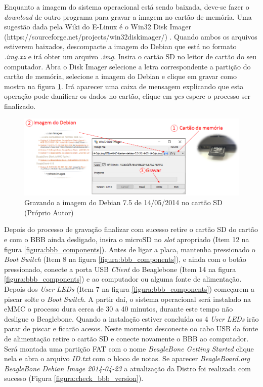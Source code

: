 Enquanto a imagem do sistema operacional está sendo baixada, deve-se fazer o \emph{download} de outro programa para gravar a imagem no cartão de memória. Uma sugestão dada pela Wiki do E-Linux é o Win32 Disk Imager (https://sourceforge.net/projects/win32diskimager/) \cite{elinuxupdatebbb}. Quando ambos os arquivos estiverem baixados, descompacte a imagem do Debian que está no formato \emph{.img.xz} e irá obter um arquivo \emph{.img}. Insira o cartão SD no leitor de cartão do seu computador. Abra o Disk Imager selecione a letra correspondente a partição do cartão de memória, selecione a imagem do Debian e clique em gravar como mostra na figura \ref{figura:update_bbb}. Irá aparecer uma caixa de mensagem explicando que esta operação pode danificar os dados no cartão, clique em \emph{yes} espere o processo ser finalizado.

\begin{figure}[h]
	\centering
	\includegraphics[width=\textwidth]{figuras/update_bbb.png}
	\caption{Gravando a imagem do Debian 7.5 de 14/05/2014 no cartão SD (Próprio Autor)}
	\label{figura:update_bbb}
\end{figure}

Depois do processo de gravação finalizar com sucesso retire o cartão SD do cartão e com o BBB ainda desligado, insira o microSD no \emph{slot} apropriado (Item 12 na figura \ref{figura:bbb_components}). Antes de ligar a placa, mantenha pressionado o \emph{Boot Switch} (Item 8 na figura \ref{figura:bbb_components}), e ainda com o botão pressionado, conecte a porta USB \emph{Client} do Beaglebone (Item 14 na figura \ref{figura:bbb_components}) e ao computador ou alguma fonte de alimentação. Depois dos \emph{User LEDs} (Item 7 na figura \ref{figura:bbb_components}) começarem a piscar solte o \emph{Boot Switch}. A partir daí, o sistema operacional será instalado na eMMC o processo dura cerca de 30 a 40 minutos, durante este tempo não desligue o Beaglebone. Quando a instalação estiver concluída os 4 \emph{User LEDs} irão parar de piscar e ficarão acesos. Neste momento desconecte oo cabo USB da fonte de alimentação retire o cartão SD e conecte novamente o BBB ao computador. Será montada uma partição FAT com o nome \emph{BeagleBone Getting Started} clique nela e abra o arquivo \emph{ID.txt} com o bloco de notas. Se aparecer \emph{BeagleBoard.org BeagleBone Debian Image 2014-04-23
} a atualização da Distro foi realizada com sucesso (Figura \ref{figura:check_bbb_version}).

